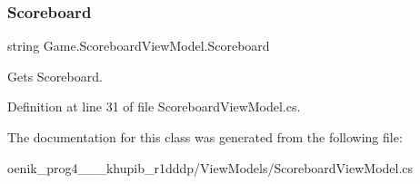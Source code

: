 \subsubsection{\texorpdfstring{Scoreboard}{Scoreboard}}
{\footnotesize\ttfamily string Game.\+Scoreboard\+View\+Model.\+Scoreboard\hspace{0.3cm}{\ttfamily [get]}}



Gets Scoreboard. 



Definition at line 31 of file Scoreboard\+View\+Model.\+cs.



The documentation for this class was generated from the following file\+:\begin{DoxyCompactItemize}
\item 
oenik\+\_\+prog4\+\_\+\_\+\_\+khupib\+\_\+r1dddp/\+View\+Models/Scoreboard\+View\+Model.\+cs\end{DoxyCompactItemize}
